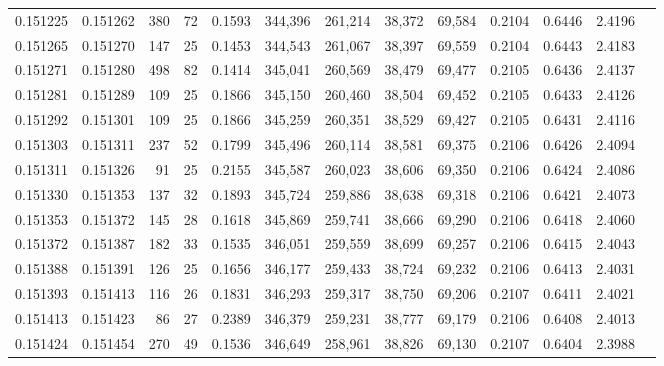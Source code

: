 \begin{tabular}{rrrrrrrrrrrrr}
0.151225 & 0.151262 &   380 &  72 &                                     0.1593 & 344,396 & 261,214 &  38,372 &  69,584 & 0.2104 & 0.6446 & 2.4196 \\
0.151265 & 0.151270 &   147 &  25 &                                     0.1453 & 344,543 & 261,067 &  38,397 &  69,559 & 0.2104 & 0.6443 & 2.4183 \\
0.151271 & 0.151280 &   498 &  82 &                                     0.1414 & 345,041 & 260,569 &  38,479 &  69,477 & 0.2105 & 0.6436 & 2.4137 \\
0.151281 & 0.151289 &   109 &  25 &                                     0.1866 & 345,150 & 260,460 &  38,504 &  69,452 & 0.2105 & 0.6433 & 2.4126 \\
0.151292 & 0.151301 &   109 &  25 &                                     0.1866 & 345,259 & 260,351 &  38,529 &  69,427 & 0.2105 & 0.6431 & 2.4116 \\
0.151303 & 0.151311 &   237 &  52 &                                     0.1799 & 345,496 & 260,114 &  38,581 &  69,375 & 0.2106 & 0.6426 & 2.4094 \\
0.151311 & 0.151326 &    91 &  25 &                                     0.2155 & 345,587 & 260,023 &  38,606 &  69,350 & 0.2106 & 0.6424 & 2.4086 \\
0.151330 & 0.151353 &   137 &  32 &                                     0.1893 & 345,724 & 259,886 &  38,638 &  69,318 & 0.2106 & 0.6421 & 2.4073 \\
0.151353 & 0.151372 &   145 &  28 &                                     0.1618 & 345,869 & 259,741 &  38,666 &  69,290 & 0.2106 & 0.6418 & 2.4060 \\
0.151372 & 0.151387 &   182 &  33 &                                     0.1535 & 346,051 & 259,559 &  38,699 &  69,257 & 0.2106 & 0.6415 & 2.4043 \\
0.151388 & 0.151391 &   126 &  25 &                                     0.1656 & 346,177 & 259,433 &  38,724 &  69,232 & 0.2106 & 0.6413 & 2.4031 \\
0.151393 & 0.151413 &   116 &  26 &                                     0.1831 & 346,293 & 259,317 &  38,750 &  69,206 & 0.2107 & 0.6411 & 2.4021 \\
0.151413 & 0.151423 &    86 &  27 &                                     0.2389 & 346,379 & 259,231 &  38,777 &  69,179 & 0.2106 & 0.6408 & 2.4013 \\
0.151424 & 0.151454 &   270 &  49 &                                     0.1536 & 346,649 & 258,961 &  38,826 &  69,130 & 0.2107 & 0.6404 & 2.3988 \\

\end{tabular}
